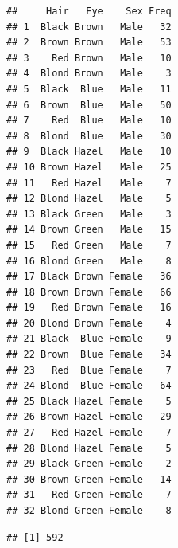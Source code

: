 \documentclass[
]{book}
\newenvironment{Shaded}{\begin{snugshade}}{\end{snugshade}}
\newcommand{\AttributeTok}[1]{\textcolor[rgb]{0.77,0.63,0.00}{#1}}
\newcommand{\ConstantTok}[1]{\textcolor[rgb]{0.00,0.00,0.00}{#1}}
\newcommand{\ControlFlowTok}[1]{\textcolor[rgb]{0.13,0.29,0.53}{\textbf{#1}}}
\newcommand{\DecValTok}[1]{\textcolor[rgb]{0.00,0.00,0.81}{#1}}
\newcommand{\DocumentationTok}[1]{\textcolor[rgb]{0.56,0.35,0.01}{\textbf{\textit{#1}}}}
\newcommand{\FunctionTok}[1]{\textcolor[rgb]{0.00,0.00,0.00}{#1}}
\newcommand{\NormalTok}[1]{#1}
\newcommand{\OtherTok}[1]{\textcolor[rgb]{0.56,0.35,0.01}{#1}}
\newcommand{\SpecialCharTok}[1]{\textcolor[rgb]{0.00,0.00,0.00}{#1}}
\newcommand{\StringTok}[1]{\textcolor[rgb]{0.31,0.60,0.02}{#1}}
\theoremstyle{definition}
\theoremstyle{definition}
\theoremstyle{definition}
\theoremstyle{remark}
\begin{document}
\begin{verbatim}
##     Hair   Eye    Sex Freq
## 1  Black Brown   Male   32
## 2  Brown Brown   Male   53
## 3    Red Brown   Male   10
## 4  Blond Brown   Male    3
## 5  Black  Blue   Male   11
## 6  Brown  Blue   Male   50
## 7    Red  Blue   Male   10
## 8  Blond  Blue   Male   30
## 9  Black Hazel   Male   10
## 10 Brown Hazel   Male   25
## 11   Red Hazel   Male    7
## 12 Blond Hazel   Male    5
## 13 Black Green   Male    3
## 14 Brown Green   Male   15
## 15   Red Green   Male    7
## 16 Blond Green   Male    8
## 17 Black Brown Female   36
## 18 Brown Brown Female   66
## 19   Red Brown Female   16
## 20 Blond Brown Female    4
## 21 Black  Blue Female    9
## 22 Brown  Blue Female   34
## 23   Red  Blue Female    7
## 24 Blond  Blue Female   64
## 25 Black Hazel Female    5
## 26 Brown Hazel Female   29
## 27   Red Hazel Female    7
## 28 Blond Hazel Female    5
## 29 Black Green Female    2
## 30 Brown Green Female   14
## 31   Red Green Female    7
## 32 Blond Green Female    8
\end{verbatim}

\begin{Shaded}
\end{Shaded}

\begin{verbatim}
## [1] 592
\end{verbatim}
\end{document}
